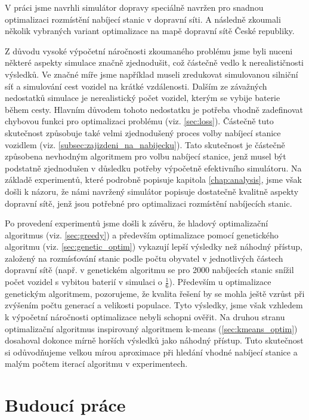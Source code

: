 \label{chap:zaver}

V práci jsme navrhli simulátor dopravy speciálně navržen pro snadnou optimalizaci
rozmístění nabíjecí stanic v dopravní síti. A následně zkoumali několik 
vybraných variant optimalizace na mapě dopravní sítě České republiky.

Z důvodu vysoké výpočetní náročnosti zkoumaného problému jsme byli nuceni
některé aspekty simulace značně zjednodušit, což částečně vedlo k 
nerealističnosti výsledků. Ve značné míře jsme například museli zredukovat 
simulovanou silniční síť a simulování cest vozidel na krátké vzdálenosti.
Dalším ze závažných nedostatků simulace je nerealistický počet vozidel,
kterým se vybije baterie během cesty. Hlavním důvodem tohoto nedostatku
je potřeba vhodně zadefinovat chybovou funkci pro optimalizaci problému
(viz. \cref{sec:loss}). Částečně tuto skutečnost způsobuje také velmi
zjednodušený proces volby nabíjecí stanice vozidlem 
(viz. \cref{subsec:zajizdeni_na_nabijecku}).
Tato skutečnost je částečně způsobena nevhodným algoritmem pro volbu nabíjecí
stanice, jenž musel být podstatně zjednodušen v důsledku potřeby výpočetně
efektivního simulátoru. Na základě experimentů, které podrobně popisuje 
kapitola \cref{chap:analysis}, jsme však došli k názoru, že námi navržený 
simulátor popisuje dostatečně kvalitně aspekty dopravní sítě, jenž jsou 
potřebné pro optimalizaci rozmístění nabíjecích stanic. 

Po provedení experimentů jsme došli k závěru, že hladový optimalizační
algoritmus (viz. \cref{sec:greedy}) a především optimalizace pomocí genetického
algoritmu (viz. \cref{sec:genetic_optim}) vykazují lepší výsledky než náhodný
přístup, založený na rozmísťování stanic podle počtu obyvatel v jednotlivých
částech dopravní sítě (např. v genetickém algoritmu se pro 2000 nabíjecích 
stanic snížil počet vozidel s vybitou baterií v simulaci o $\frac{1}{6}$).
Především u optimalizace genetickým algoritmem, pozorujeme, že kvalita řešení 
by se mohla ještě vzrůst při zvýšením počtu generací a velikosti populace.
Tyto výsledky, jsme však vzhledem k výpočetní náročnosti optimalizace nebyli 
schopni ověřit. Na druhou stranu optimalizační algoritmus inspirovaný algoritmem
k-means (\cref{sec:kmeans_optim}) dosahoval dokonce mírně horších výsledků jako
náhodný přístup. Tuto skutečnost si odůvodňujeme velkou mírou aproximace při 
hledání vhodné nabíjecí stanice a malým počtem iterací algoritmu v experimentech.


\section*{Budoucí práce}

